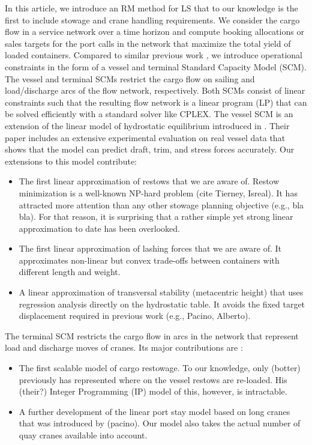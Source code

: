 	In this article, we introduce an RM method for LS that to our knowledge is the first to include stowage and crane handling requirements. We consider the cargo flow in a service network over a time horizon and compute booking allocations or sales targets for the port calls in the network that maximize the total yield of loaded containers. Compared to similar previous work \citep[e.g.,][]{Zurheide15}, we introduce operational constraints in the form of a vessel and terminal Standard Capacity Model (SCM). The vessel and terminal SCMs restrict the cargo flow on sailing and load/discharge arcs of the flow network, respectively. Both SCMs consist of linear constraints such that the resulting flow network is a linear program (LP) that can be solved efficiently with a standard solver like CPLEX. The vessel SCM is an extension of the linear model of hydrostatic equilibrium introduced in \citep{iccl18}. Their paper includes an extensive experimental evaluation on real vessel data that shows that the model can predict draft, trim, and stress forces accurately. Our extensions to this model contribute:
\begin{itemize}

\item The first linear approximation of restows that we are aware of. Restow minimization is a well-known NP-hard problem (cite Tierney, Isreal). It has attracted more attention than any other stowage planning objective  (e.g., bla bla). For that reason, it is surprising that a rather simple yet strong linear approximation to date has been overlooked. 

\item The first linear approximation of lashing forces that we are aware of. It approximates non-linear but convex trade-offs between containers with different length and weight. 
  
\item A linear approximation of transversal stability (metacentric height) that uses regression analysis directly on the hydrostatic table. It avoids the fixed target displacement required in previous work (e.g., Pacino, Alberto).
  
\end{itemize}

The terminal SCM restricts the cargo flow in arcs in the network that represent load and discharge moves of cranes. Its major contributions are : 
\begin{itemize}

\item The first scalable model of cargo restowage. To our knowledge, only (botter) previously has represented where on the vessel restows are re-loaded. His (their?) Integer Programming (IP) model of this, however, is intractable.

\item A further development of the linear port stay model based on long cranes that was introduced by (pacino). Our model also takes the actual number of quay cranes available into account.    

\end{itemize}


